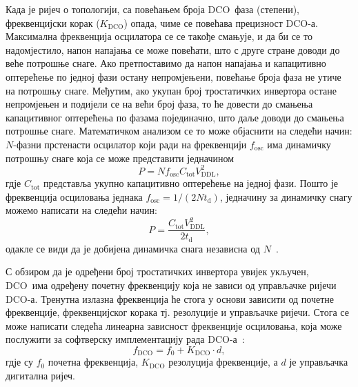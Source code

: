 \documentclass[master]{finthesis}
\def \DCO  {DCO} %
\begin{document}
Када је ријеч о топологији, са повећањем броја \DCO\ фаза (степени), фреквенцијски корак ($K_\text{DCO}$) опада, чиме се повећава прецизност \DCO-а. Максимална фреквенција осцилатора се се такође смањује, и да би се то надомјестило, напон напајања се може повећати, што с друге стране доводи до веће потрошње снаге. Ако претпоставимо да напон напајања и капацитивно оптерећење по једној фази остану непромјењени, повећање броја фаза не утиче на потрошњу снаге. Међутим, ако укупан број тростатичких инвертора остане непромјењен и подијели се на већи број фаза, то ће довести до смањења капацитивног оптерећења по фазама појединачно, што даље доводи до смањења потрошње снаге. Математичком анализом се то може објаснити на следећи начин: $N$-фазни прстенасти осцилатор који ради на фреквенцији $f_\text{osc}$ има динамичку потрошњу снаге која се може представити једначином
\begin{equation} 
	\label{eq:dco:dynamic_pwr_1}
    	P = N f_\text{osc} C_\text{tot} V^{2}_\text{DDL}, 
\end{equation}
гдје $C_\text{tot}$ представља укупно капацитивно оптерећење на једној фази. Пошто је фреквенција осциловања једнака $f_\text{osc} = 1/(2Nt_\text{d})$, једначину за динамичку снагу можемо написати на следећи начин:
\begin{equation}
    	P = \frac{C_\text{tot}V^{2}_\text{DDL}}{2t_\text{d}},
\end{equation}
одакле се види да је добијена динамичка снага независна од $N$~\cite{Razavi:PLL_CMOS_2020}. \par
С обзиром да је одређени број тростатичких инвертора увијек укључен, \DCO\ има одређену почетну фреквенцију која не зависи од управљачке ријечи \DCO-а. Тренутна излазна фреквенција ће стога у основи зависити од почетне фреквенције, фреквенцијског корака тј. резолуције и управљачке ријечи. Стога се може написати следећа линеарна зависност фреквенције осциловања, која може послужити за софтверску имплементацију рада \DCO-а~:  
\begin{equation} \label{f_dco}
	f_\text{DCO} = f_\text{0} + K_\text{DCO} \cdot d,
\end{equation} 
гдје су $f_\text{0}$ почетна фреквенција, $K_\text{DCO}$ резолуција фреквенције, а $d$ је управљачка дигитална ријеч.
\end{document}
